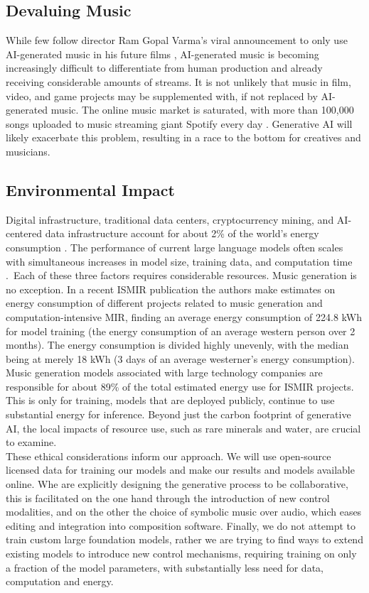 \subsection{Devaluing Music}
While few follow director Ram Gopal Varma’s viral announcement to only use AI-generated music in his future films \cite{Singh_2024}, AI-generated music is becoming increasingly difficult to differentiate from human production and already receiving considerable amounts of streams. It is not unlikely that music in film, video, and game projects may be supplemented with, if not replaced by AI-generated music. The online music market is saturated, with more than 100,000 songs uploaded to music streaming giant Spotify every day \cite{Stassen_2023}. Generative AI will likely exacerbate this problem, resulting in a race to the bottom for creatives and musicians. 

\subsection{Environmental Impact}
Digital infrastructure, traditional data centers, cryptocurrency mining, and AI-centered data infrastructure account for about 2\% of the world's energy consumption \cite{Marechal_2024}. The performance of current large language models often scales with simultaneous increases in model size, training data, and computation time \cite{Kaplan_McCandlish_Henighan_Brown_Chess_Child_Gray_Radford_Wu_Amodei_2020}. Each of these three factors requires considerable resources. Music generation is no exception. In a recent ISMIR publication \cite{Holzapfel_Kaila_Jääskeläinen_2024} the authors make estimates on energy consumption of different projects related to music generation and computation-intensive MIR, finding an average energy consumption of 224.8 kWh for model training (the energy consumption of an average western person over 2 months). The energy consumption is divided highly unevenly, with the median being at merely 18 kWh (3 days of an average westerner's energy consumption). Music generation models associated with large technology companies are responsible for about 89\% of the total estimated energy use for ISMIR projects. This is only for training, models that are deployed publicly, continue to use substantial energy for inference. Beyond just the carbon footprint of generative AI, the local impacts of resource use, such as rare minerals and water, are crucial to examine. \\

These ethical considerations inform our approach. We will use open-source licensed data for training our models and make our results and models available online. Whe  are explicitly designing the generative process to be collaborative, this is facilitated on the one hand through the introduction of new control modalities, and on the other the choice of symbolic music over audio, which eases editing and integration into composition software. Finally, we do not attempt to train custom large foundation models, rather we are trying to find ways to extend existing models to introduce new control mechanisms, requiring training on only a fraction of the model parameters, with substantially less need for data, computation and energy.

